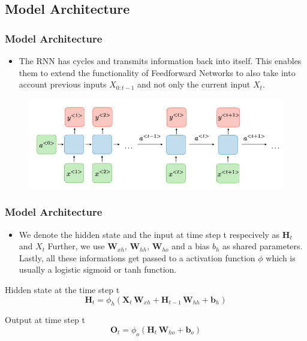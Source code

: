 \documentclass[
	11pt,
]{beamer}
\begin{document}
\subsection{Model Architecture}
\begin{frame}
	\frametitle{Model Architecture}
	\begin{itemize}
		\item The RNN has cycles and transmits information back into itself. This enables them to extend
	the functionality of Feedforward Networks to also take into account previous inputs $X_{0:t-1}$ and not only the current
	input $X_t$.
	\end{itemize}
	\begin{figure}
		\centering
		\includegraphics[scale=0.5]{model_architecture_1.png}
	\end{figure}
\end{frame}
\begin{frame}
	\frametitle{Model Architecture}
	\begin{itemize}
		\item We denote the hidden state and the input at time step t respecively as $\mathbf{H}_t$ and $X_t$
Further, we use $\mathbf{W}_{xh}$, $\mathbf{W}_{hh}$, $\mathbf{W}_{ho}$ and a bias $b_h$ as shared parameters. Lastly, all these informations get passed to a activation function $\phi$ which is usually a logistic sigmoid or
tanh function.
	\end{itemize}
	\begin{block}{Hidden state at the time step t}
		\begin{equation*}
			\mathbf{H}_t = \phi_h(\mathbf{X}_t\,\mathbf{W}_{xh} + \mathbf{H}_{t-1}\,\mathbf{W}_{hh} + \mathbf{b}_h)
		\end{equation*}
	\end{block}
	\smallskip
	\begin{block}{Output at time step t}
		\begin{equation*}
			\mathbf{O}_t = \phi_o (\mathbf{H}_t\,\mathbf{W}_{ho} + \mathbf{b}_o)
		\end{equation*}
	\end{block}
\end{frame}
\end{document}
